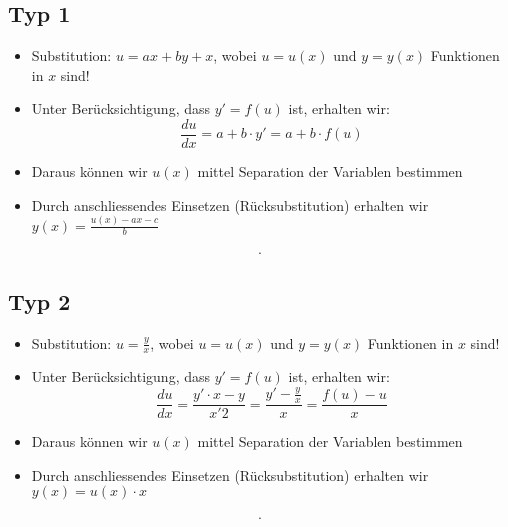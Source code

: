 \subsection{Typ 1}
\begin{itemize}
	\item Substitution: $u = ax + by + x$, wobei $u = u(x)$ und $y = y(x)$ Funktionen in $x$ sind!
	\item Unter Berücksichtigung, dass $y' = f(u)$ ist, erhalten wir:
	$$\frac{du}{dx} = a + b \cdot y' = a + b \cdot f(u)$$
	\item Daraus können wir $u(x)$ mittel Separation der Variablen bestimmen
	\item Durch anschliessendes Einsetzen (Rücksubstitution) erhalten wir $y(x) = \frac{u(x) - ax - c}{b}$
\end{itemize}

\begin{bsp}
\begin{align*}
.
\end{align*}
\end{bsp}

\subsection{Typ 2}
\begin{itemize}
	\item Substitution: $u = \frac{y}{x}$, wobei $u = u(x)$ und $y = y(x)$ Funktionen in $x$ sind!
	\item Unter Berücksichtigung, dass $y' = f(u)$ ist, erhalten wir:
	$$\frac{du}{dx} = \frac{y' \cdot x -y }{x'2} = \frac{y' -\frac{y}{x}}{x} = \frac{f(u)-u}{x}$$
	\item Daraus können wir $u(x)$ mittel Separation der Variablen bestimmen
	\item Durch anschliessendes Einsetzen (Rücksubstitution) erhalten wir $y(x) = u(x) \cdot x$
\end{itemize}

\begin{bsp}
\begin{align*}
.
\end{align*}
\end{bsp}